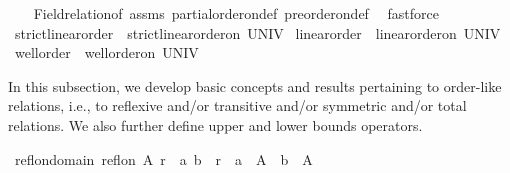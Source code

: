\begin{isabellebody}
%
\isadelimproof
\ \ %
\endisadelimproof
%
\isatagproof
{}\isamarkupfalse%
\ Field{\isacharunderscore}{\kern0pt}relation{\isacharunderscore}{\kern0pt}of\ assms\ partial{\isacharunderscore}{\kern0pt}order{\isacharunderscore}{\kern0pt}on{\isacharunderscore}{\kern0pt}def\ preorder{\isacharunderscore}{\kern0pt}on{\isacharunderscore}{\kern0pt}def\ \isamarkupfalse%
\ fastforce%
\endisatagproof
{\isafoldproof}%
%
\isadelimproof
%
\endisadelimproof
%
\isadelimdocument
%
\endisadelimdocument
%
\isatagdocument
%
\isamarkuptrue%
%
\endisatagdocument
{\isafolddocument}%
%
\isadelimdocument
%
\endisadelimdocument
{}\isamarkupfalse%
\ {\isachardoublequoteopen}strict{\isacharunderscore}{\kern0pt}linear{\isacharunderscore}{\kern0pt}order\ {\isasymequiv}\ strict{\isacharunderscore}{\kern0pt}linear{\isacharunderscore}{\kern0pt}order{\isacharunderscore}{\kern0pt}on\ UNIV{\isachardoublequoteclose}\isanewline
\isanewline
{}\isamarkupfalse%
\ {\isachardoublequoteopen}linear{\isacharunderscore}{\kern0pt}order\ {\isasymequiv}\ linear{\isacharunderscore}{\kern0pt}order{\isacharunderscore}{\kern0pt}on\ UNIV{\isachardoublequoteclose}\isanewline
\isanewline
{}\isamarkupfalse%
\ {\isachardoublequoteopen}well{\isacharunderscore}{\kern0pt}order\ {\isasymequiv}\ well{\isacharunderscore}{\kern0pt}order{\isacharunderscore}{\kern0pt}on\ UNIV{\isachardoublequoteclose}%
\isadelimdocument
%
\endisadelimdocument
%
\isatagdocument
%
\isamarkuptrue%
%
\endisatagdocument
{\isafolddocument}%
%
\isadelimdocument
%
\endisadelimdocument
%
\begin{isamarkuptext}%
In this subsection, we develop basic concepts and results pertaining
  to order-like relations, i.e., to reflexive and/or transitive and/or symmetric and/or
  total relations. We also further define upper and lower bounds operators.%
\end{isamarkuptext}\isamarkuptrue%
%
\isadelimdocument
%
\endisadelimdocument
%
\isatagdocument
%
\isamarkuptrue%
%
\endisatagdocument
{\isafolddocument}%
%
\isadelimdocument
%
\endisadelimdocument
{}\isamarkupfalse%
\ refl{\isacharunderscore}{\kern0pt}on{\isacharunderscore}{\kern0pt}domain{\isacharcolon}{\kern0pt}\ {\isachardoublequoteopen}refl{\isacharunderscore}{\kern0pt}on\ A\ r\ {\isasymLongrightarrow}\ {\isacharparenleft}{\kern0pt}a{\isacharcomma}{\kern0pt}\ b{\isacharparenright}{\kern0pt}\ {\isasymin}\ r\ {\isasymLongrightarrow}\ a\ {\isasymin}\ A\ {\isasymand}\ b\ {\isasymin}\ A{\isachardoublequoteclose}\isanewline

\end{isabellebody}
